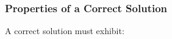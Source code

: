 \documentclass[12pt]{article}
\begin{document}




\subsubsection{Properties of a Correct Solution} \label{sec_CorrectSolution}

\noindent
A correct solution must exhibit: 
\end{document}
